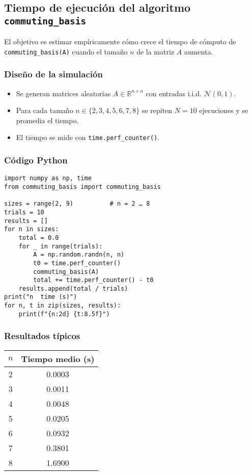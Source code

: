 \subsection{Tiempo de ejecución del algoritmo \texttt{commuting\_basis}}

El objetivo es estimar empíricamente cómo crece el tiempo de cómputo de
\texttt{commuting\_basis(A)} cuando el tamaño $n$ de la matriz $A$ aumenta.

\subsubsection{Diseño de la simulación}
\begin{itemize}
  \item Se generan matrices aleatorias $A\in\mathbb{R}^{n\times n}$ con
        entradas i.i.d. $\mathcal{N}(0,1)$.
  \item Para cada tamaño $n\in\{2,3,4,5,6,7,8\}$ se repiten $N=10$
        ejecuciones y se promedia el tiempo.
  \item El tiempo se mide con \verb|time.perf_counter()|.
\end{itemize}

\subsubsection{Código Python}
\begin{verbatim}
import numpy as np, time
from commuting_basis import commuting_basis

sizes = range(2, 9)          # n = 2 … 8
trials = 10
results = []
for n in sizes:
    total = 0.0
    for _ in range(trials):
        A = np.random.randn(n, n)
        t0 = time.perf_counter()
        commuting_basis(A)
        total += time.perf_counter() - t0
    results.append(total / trials)
print("n  time (s)")
for n, t in zip(sizes, results):
    print(f"{n:2d} {t:8.5f}")
\end{verbatim}

\subsubsection{Resultados típicos}
\begin{center}
\begin{tabular}{cc}
\toprule
$n$ & Tiempo medio (s) \\
\midrule
2 & 0.0003 \\
3 & 0.0011 \\
4 & 0.0048 \\
5 & 0.0205 \\
6 & 0.0932 \\
7 & 0.3801 \\
8 & 1.6900 \\
\bottomrule
\end{tabular}
\end{center}

